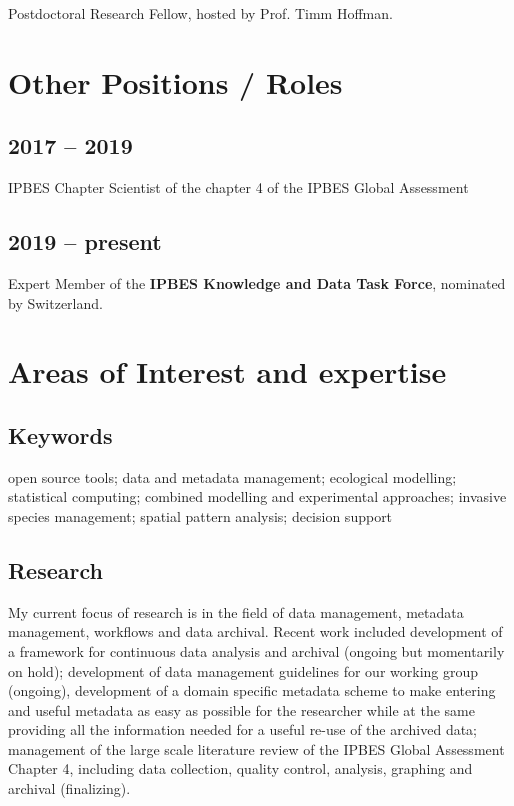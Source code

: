 \documentclass[a4paper]{article}
\begin{document}
Postdoctoral Research Fellow, hosted by Prof. Timm Hoffman.

\section{Other Positions / Roles}

\subsection{2017 -- 2019}

IPBES Chapter Scientist of the chapter 4 of the IPBES Global Assessment

\subsection{2019 -- present}

Expert Member of the \textbf{IPBES Knowledge and Data Task Force}, nominated by Switzerland. 


\section{Areas of Interest and expertise}

\subsection{Keywords}

open source tools; data and metadata management; ecological modelling; statistical computing; combined modelling and experimental approaches; invasive species management; spatial pattern analysis; decision support

\subsection{Research}


My current focus of research is in the field of data management, metadata management, workflows and data archival. Recent work included development of a framework for continuous data analysis and archival (ongoing but momentarily on hold); development of data management guidelines for our working group (ongoing), development of a domain specific metadata scheme to make entering and useful metadata as easy as possible for the researcher while at the same providing all the information needed for a useful re-use of the archived data; management of the large scale literature review of the IPBES Global Assessment Chapter 4, including data collection, quality control, analysis, graphing and archival (finalizing).
\end{document}
